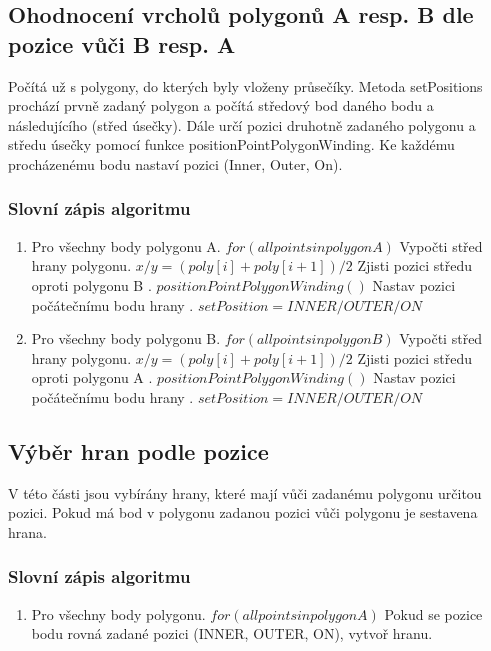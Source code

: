 \documentclass[a4paper,11pt,twoside]{article}
\begin{document}
\newpage
\vspace*{-1cm}
\subsection{Ohodnocení vrcholů polygonů A resp. B dle pozice vůči B resp. A}
Počítá už s polygony, do kterých byly vloženy průsečíky. Metoda setPositions prochází prvně zadaný polygon a počítá středový bod daného bodu a následujícího (střed úsečky). Dále určí pozici druhotně zadaného polygonu a středu úsečky pomocí funkce positionPointPolygonWinding. Ke každému procházenému bodu nastaví pozici (Inner, Outer, On). 

\subsubsection{Slovní zápis algoritmu}
\begin{enumerate}
\item Pro všechny body polygonu A. $ for( all points in polygon A ) $
\subitem Vypočti střed hrany polygonu. $ x/y = (poly[i] + poly[i+1])/2 $
\subitem Zjisti pozici středu oproti polygonu B . $ positionPointPolygonWinding() $
\subitem Nastav pozici počátečnímu bodu hrany . $ setPosition = INNER/OUTER/ON $
\item Pro všechny body polygonu B. $ for( all points in polygon B ) $
\subitem Vypočti střed hrany polygonu. $ x/y = (poly[i] + poly[i+1])/2 $
\subitem Zjisti pozici středu oproti polygonu A . $ positionPointPolygonWinding() $
\subitem Nastav pozici počátečnímu bodu hrany . $  setPosition = INNER/OUTER/ON $
\end{enumerate}

\subsection{Výběr hran podle pozice}
V této části jsou vybírány hrany, které mají vůči zadanému polygonu určitou pozici. Pokud má bod v polygonu zadanou pozici vůči polygonu je sestavena hrana. 

\subsubsection{Slovní zápis algoritmu}
\begin{enumerate}
\item Pro všechny body polygonu. $ for( all points in polygon A ) $
\subitem Pokud se pozice bodu rovná zadané pozici (INNER, OUTER, ON), vytvoř hranu.
\end{enumerate}
\end{document}
